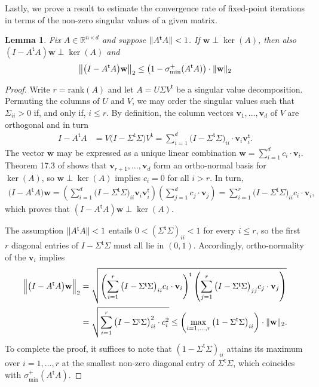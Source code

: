 \documentclass{article}
\newcommand*{\R}{\mathbb{R}}
\newcommand*{\bfv}{\mathbf{v}}
\newcommand*{\bfw}{\mathbf{w}}
\newcommand*{\tran}{^{\mathsf{t}}}
\newcommand*{\sigminp}{\sigma_{\mathrm{min}}^+}
\DeclarePairedDelimiter{\norm}{\lVert}{\rVert}
\newcommand*{\rank}{\mathrm{rank}}
\newtheorem{lemma}{Lemma}[section]
\begin{document}
Lastly, we prove a result to estimate the convergence rate of fixed-point
iterations in terms of the non-zero singular values of a given matrix.

\begin{lemma}
  \label{lem::fixp_conv}
  Fix $A \in \R^{n \times d}$ and suppose $\norm{A\tran A} < 1$. If $\bfw \perp
  \ker(A)$, then also $(I - A\tran A) \bfw \perp \ker(A)$ and \begin{align*}
    \norm[\big]{\big(I - A\tran A\big) \bfw}_2 \leq \big(1 - \sigminp(A\tran
    A)\big) \cdot \norm{\bfw}_2
  \end{align*}
\end{lemma}

\begin{proof}
  Write $r = \rank(A)$ and let $A = U \Sigma V\tran$ be a singular value
  decomposition. Permuting the columns of $U$ and $V$, we may order the singular
  values such that $\Sigma_{ii} > 0$ if, and only if, $i \leq r$. By definition,
  the column vectors $\bfv_1, \ldots, \bfv_d$ of $V$ are orthogonal and in turn
  \begin{align*}
    I - A\tran A &= V \big(I - \Sigma\tran \Sigma\big) V\tran = \sum_{i = 1}^d
    \big(I - \Sigma\tran \Sigma\big)_{ii} \cdot \bfv_i \bfv_i\tran.
  \end{align*} The vector $\bfw$ may be expressed as a unique linear combination
  $\bfw = \sum_{i = 1}^d c_i \cdot \bfv_i$. Theorem 17.3 of \cite{roman_2008}
  shows that $\bfv_{r + 1}, \ldots, \bfv_d$ form an ortho-normal basis for
  $\ker(A)$, so $\bfw \perp \ker(A)$ implies $c_i = 0$ for all $i > r$. In
  turn, \begin{align*}
    \big(I - A\tran A\big) \bfw = \left(\sum_{i = 1}^{d} \big(I - \Sigma\tran
    \Sigma\big)_{ii} \bfv_i \bfv_i\tran\right) \left(\sum_{j = 1}^d c_j \cdot
    \bfv_j\right) = \sum_{i = 1}^r \big(I - \Sigma\tran \Sigma\big)_{ii} c_i
    \cdot \bfv_i,
  \end{align*} which proves that $(I - A\tran A) \bfw \perp \ker(A)$.

  The assumption $\norm{A\tran A} < 1$ entails $0 < (\Sigma\tran \Sigma)_{ii} <
  1$ for every $i \leq r$, so the first $r$ diagonal entries of $I - \Sigma\tran
  \Sigma$ must all lie in $(0, 1)$. Accordingly, ortho-normality of the $\bfv_i$
  implies \begin{align*}
    \norm[\Big]{\big(I - A\tran A\big)\bfw}_2 &= \sqrt{\left(\sum_{i = 1}^r
    \big(I - \Sigma\tran \Sigma\big)_{ii} c_i \cdot \bfv_i\right)\tran
    \left(\sum_{j = 1}^r \big(I - \Sigma\tran \Sigma\big)_{jj} c_j \cdot
    \bfv_j\right)}\\
    &= \sqrt{\sum_{i = 1}^r \big(I - \Sigma\tran \Sigma\big)_{ii}^2 \cdot c_i^2}
    \leq \left(\max_{i = 1, \ldots, r} \big(1 - \Sigma\tran
    \Sigma\big)_{ii}\right) \cdot \norm{\bfw}_2.
  \end{align*} To complete the proof, it suffices to note that $(1 - \Sigma\tran
  \Sigma)_{ii}$ attains its maximum over $i = 1, \ldots, r$ at the smallest
  non-zero diagonal entry of $\Sigma\tran \Sigma$, which coincides with
  $\sigminp(A\tran A)$.
\end{proof}
\end{document}
